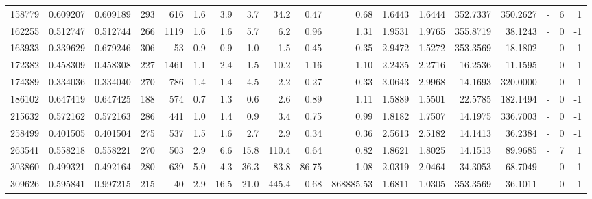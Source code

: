 \begin{tabular}{rrrrrrrrrrrrrrrlrr}
    158779 & 0.609207 &   0.609189 &  293 &  616 &      1.6 &      3.9 &     3.7 &     34.2 &       0.47 &        0.68 &  1.6443 &  1.6444 &  352.7337 &  350.2627 &             - &        6 &          1 \\
    162255 & 0.512747 &   0.512744 &  266 & 1119 &      1.6 &      1.6 &     5.7 &      6.2 &       0.96 &        1.31 &  1.9531 &  1.9765 &  355.8719 &   38.1243 &             - &        0 &         -1 \\
    163933 & 0.339629 &   0.679246 &  306 &   53 &      0.9 &      0.9 &     1.0 &      1.5 &       0.45 &        0.35 &  2.9472 &  1.5272 &  353.3569 &   18.1802 &             - &        0 &         -1 \\
    172382 & 0.458309 &   0.458308 &  227 & 1461 &      1.1 &      2.4 &     1.5 &     10.2 &       1.16 &        1.10 &  2.2435 &  2.2716 &   16.2536 &   11.1595 &             - &        0 &         -1 \\
    174389 & 0.334036 &   0.334040 &  270 &  786 &      1.4 &      1.4 &     4.5 &      2.2 &       0.27 &        0.33 &  3.0643 &  2.9968 &   14.1693 &  320.0000 &             - &        0 &         -1 \\
    186102 & 0.647419 &   0.647425 &  188 &  574 &      0.7 &      1.3 &     0.6 &      2.6 &       0.89 &        1.11 &  1.5889 &  1.5501 &   22.5785 &  182.1494 &             - &        0 &         -1 \\
    215632 & 0.572162 &   0.572163 &  286 &  441 &      1.0 &      1.4 &     0.9 &      3.4 &       0.75 &        0.99 &  1.8182 &  1.7507 &   14.1975 &  336.7003 &             - &        0 &         -1 \\
    258499 & 0.401505 &   0.401504 &  275 &  537 &      1.5 &      1.6 &     2.7 &      2.9 &       0.34 &        0.36 &  2.5613 &  2.5182 &   14.1413 &   36.2384 &             - &        0 &         -1 \\
    263541 & 0.558218 &   0.558221 &  270 &  503 &      2.9 &      6.6 &    15.8 &    110.4 &       0.64 &        0.82 &  1.8621 &  1.8025 &   14.1513 &   89.9685 &             - &        7 &          1 \\
    303860 & 0.499321 &   0.492164 &  280 &  639 &      5.0 &      4.3 &    36.3 &     83.8 &      86.75 &        1.08 &  2.0319 &  2.0464 &   34.3053 &   68.7049 &             - &        0 &         -1 \\
    309626 & 0.595841 &   0.997215 &  215 &   40 &      2.9 &     16.5 &    21.0 &    445.4 &       0.68 &   868885.53 &  1.6811 &  1.0305 &  353.3569 &   36.1011 &             - &        0 &         -1 \\

\end{tabular}
